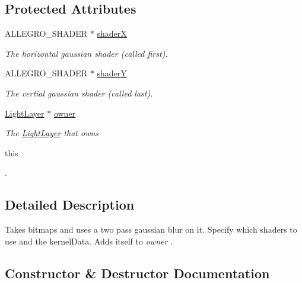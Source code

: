 \subsection*{Protected Attributes}
\begin{DoxyCompactItemize}
\item 
A\+L\+L\+E\+G\+R\+O\+\_\+\+S\+H\+A\+D\+ER $\ast$ \hyperlink{classlighting_1_1GaussianBlurrer_a36d10a62e2fd99e1182c596425fbacfa}{shaderX}
\begin{DoxyCompactList}\small\item\em The horizontal gaussian shader (called first). \end{DoxyCompactList}\item 
A\+L\+L\+E\+G\+R\+O\+\_\+\+S\+H\+A\+D\+ER $\ast$ \hyperlink{classlighting_1_1GaussianBlurrer_a57c41b5a1dd0712e98d085a8a90172d4}{shaderY}
\begin{DoxyCompactList}\small\item\em The vertial gaussian shader (called last). \end{DoxyCompactList}\item 
\hyperlink{classlighting_1_1LightLayer}{Light\+Layer} $\ast$ \hyperlink{classlighting_1_1GaussianBlurrer_ae673db1b5f734d90a45628a33cc73bd1}{owner}
\begin{DoxyCompactList}\small\item\em The \hyperlink{classlighting_1_1LightLayer}{Light\+Layer} that owns 
\begin{DoxyCode}
\textcolor{keyword}{this}
\end{DoxyCode}
. \end{DoxyCompactList}\end{DoxyCompactItemize}


\subsection{Detailed Description}
Takes bitmaps and uses a two pass gaussian blur on it. Specify which shaders to use and the kernel\+Data. Adds itself to {\itshape owner} . 



\subsection{Constructor \& Destructor Documentation}
